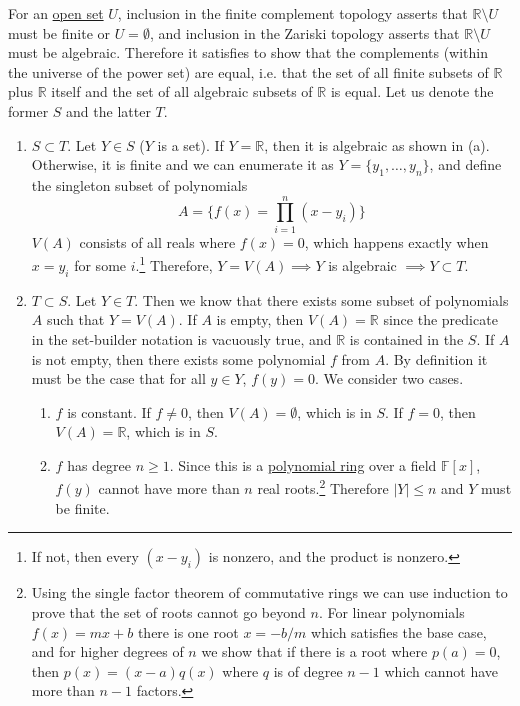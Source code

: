   \begin{solution}[e]
    For an \hyperref[def:open-set]{open set} $U$, inclusion in the finite complement topology asserts that $\mathbb{R} \setminus U$ must be finite or $U = \emptyset$, and inclusion in the Zariski topology asserts that $\mathbb{R} \setminus U$ must be algebraic. Therefore it satisfies to show that the complements (within the universe of the power set) are equal, i.e. that the set of all finite subsets of $\mathbb{R}$ plus $\mathbb{R}$ itself and the set of all algebraic subsets of $\mathbb{R}$ is equal. Let us denote the former $S$ and the latter $T$. 
    \begin{enumerate}
      \item $S \subset T$. Let $Y \in S$ ($Y$ is a set). If $Y = \mathbb{R}$, then it is algebraic as shown in (a). Otherwise, it is finite and we can enumerate it as $Y = \{y_1, \ldots, y_n\}$, and define the singleton subset of polynomials 
      \begin{equation}
        A = \bigg\{ f(x) = \prod_{i=1}^n (x - y_i) \bigg\}
      \end{equation} 
      $V(A)$ consists of all reals where $f(x) = 0$, which happens exactly when $x = y_i$ for some $i$.\footnote{If not, then every $(x - y_i)$ is nonzero, and the product is nonzero.} Therefore, $Y = V(A) \implies Y$ is algebraic $\implies Y \subset T$. 

      \item $T \subset S$. Let $Y \in T$. Then we know that there exists some subset of polynomials $A$ such that $Y = V(A)$. If $A$ is empty, then $V(A) = \mathbb{R}$ since the predicate in the set-builder notation is vacuously true, and $\mathbb{R}$ is contained in the $S$. If $A$ is not empty, then there exists some polynomial $f$ from $A$. By definition it must be the case that for all $y \in Y$, $f(y) = 0$. We consider two cases. 
      \begin{enumerate}
        \item $f$ is constant. If $f \neq 0$, then $V(A) = \emptyset$, which is in $S$. If $f = 0$, then $V(A) = \mathbb{R}$, which is in $S$. 
        \item $f$ has degree $n \geq 1$. Since this is a \hyperref[alg-def:polynomial-ring]{polynomial ring} over a field $\mathbb{F}[x]$, $f(y)$ cannot have more than $n$ real roots.\footnote{Using the single factor theorem of commutative rings we can use induction to prove that the set of roots cannot go beyond $n$. For linear polynomials $f(x) = mx + b$ there is one root $x = -b/m$ which satisfies the base case, and for higher degrees of $n$ we show that if there is a root where $p(a) = 0$, then $p(x) = (x - a) q(x)$ where $q$ is of degree $n-1$ which cannot have more than $n-1$ factors.} Therefore $|Y| \leq n$ and $Y$ must be finite. 
      \end{enumerate}


\end{enumerate}
\end{solution}
